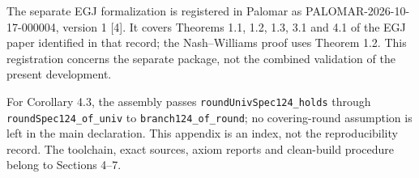 \documentclass[english,11pt,a4paper]{article}
\begin{document}
The separate EGJ formalization is registered in Palomar as PALOMAR-2026-10-17-000004, version 1 {[}4{]}. It covers Theorems 1.1, 1.2, 1.3, 3.1 and 4.1 of the EGJ paper identified in that record; the Nash--Williams proof uses Theorem 1.2. This registration concerns the separate package, not the combined validation of the present development.

For Corollary 4.3, the assembly passes \texttt{round\allowbreak{}Univ\allowbreak{}Spec124\_\allowbreak{}holds} through \texttt{round\allowbreak{}Spec124\_\allowbreak{}of\_\allowbreak{}univ} to \texttt{branch124\_\allowbreak{}of\_\allowbreak{}round}; no covering-round assumption is left in the main declaration. This appendix is an index, not the reproducibility record. The toolchain, exact sources, axiom reports and clean-build procedure belong to Sections 4--7.
\end{document}
